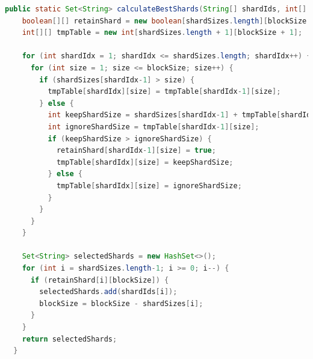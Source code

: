 \documentclass[11pt, a4paper, twocolumn, twoside]{report}
\begin{document}
\begin{lstlisting}[language=Java, caption=Knapsack Shard to Block Fitter, label=lst:shard2block]
  public static Set<String> calculateBestShards(String[] shardIds, int[] shardSizes, int blockSize) {
    boolean[][] retainShard = new boolean[shardSizes.length][blockSize + 1];
    int[][] tmpTable = new int[shardSizes.length + 1][blockSize + 1];

    for (int shardIdx = 1; shardIdx <= shardSizes.length; shardIdx++) {
      for (int size = 1; size <= blockSize; size++) {
        if (shardSizes[shardIdx-1] > size) {
          tmpTable[shardIdx][size] = tmpTable[shardIdx-1][size];
        } else {
          int keepShardSize = shardSizes[shardIdx-1] + tmpTable[shardIdx-1][size-shardSizes[shardIdx-1]];
          int ignoreShardSize = tmpTable[shardIdx-1][size];
          if (keepShardSize > ignoreShardSize) {
            retainShard[shardIdx-1][size] = true;
            tmpTable[shardIdx][size] = keepShardSize;
          } else {
            tmpTable[shardIdx][size] = ignoreShardSize;
          }
        }
      }
    }

    Set<String> selectedShards = new HashSet<>();
    for (int i = shardSizes.length-1; i >= 0; i--) {
      if (retainShard[i][blockSize]) {
        selectedShards.add(shardIds[i]);
        blockSize = blockSize - shardSizes[i];
      }
    }
    return selectedShards;
  }
\end{lstlisting}
\end{document}

